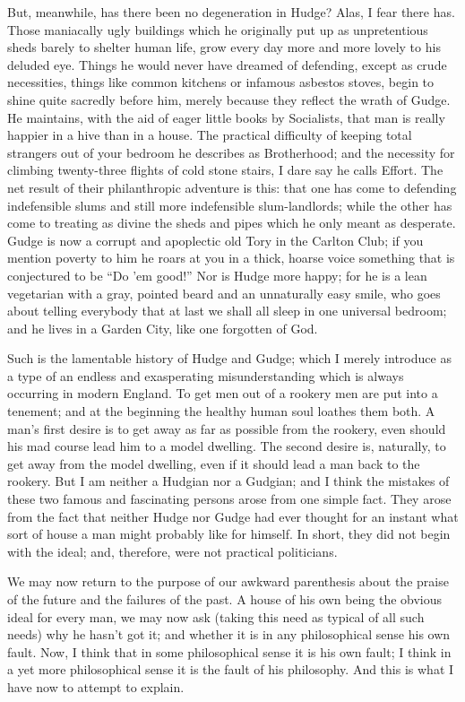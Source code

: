 \documentclass{book}
\begin{document}
But, meanwhile, has there been no degeneration in Hudge? Alas, I fear there has. Those maniacally ugly buildings which he originally put up as unpretentious sheds barely to shelter human life, grow every day more and more lovely to his deluded eye. Things he would never have dreamed of defending, except as crude necessities, things like common kitchens or infamous asbestos stoves, begin to shine quite sacredly before him, merely because they reflect the wrath of Gudge. He maintains, with the aid of eager little books by Socialists, that man is really happier in a hive than in a house. The practical difficulty of keeping total strangers out of your bedroom he describes as Brotherhood; and the necessity for climbing twenty-three flights of cold stone stairs, I dare say he calls Effort. The net result of their philanthropic adventure is this: that one has come to defending indefensible slums and still more indefensible slum-landlords; while the other has come to treating as divine the sheds and pipes which he only meant as desperate. Gudge is now a corrupt and apoplectic old Tory in the Carlton Club; if you mention poverty to him he roars at you in a thick, hoarse voice something that is conjectured to be “Do ’em good!” Nor is Hudge more happy; for he is a lean vegetarian with a gray, pointed beard and an unnaturally easy smile, who goes about telling everybody that at last we shall all sleep in one universal bedroom; and he lives in a Garden City, like one forgotten of God.

Such is the lamentable history of Hudge and Gudge; which I merely introduce as a type of an endless and exasperating misunderstanding which is always occurring in modern England. To get men out of a rookery men are put into a tenement; and at the beginning the healthy human soul loathes them both. A man’s first desire is to get away as far as possible from the rookery, even should his mad course lead him to a model dwelling. The second desire is, naturally, to get away from the model dwelling, even if it should lead a man back to the rookery. But I am neither a Hudgian nor a Gudgian; and I think the mistakes of these two famous and fascinating persons arose from one simple fact. They arose from the fact that neither Hudge nor Gudge had ever thought for an instant what sort of house a man might probably like for himself. In short, they did not begin with the ideal; and, therefore, were not practical politicians.

We may now return to the purpose of our awkward parenthesis about the praise of the future and the failures of the past. A house of his own being the obvious ideal for every man, we may now ask (taking this need as typical of all such needs) why he hasn’t got it; and whether it is in any philosophical sense his own fault. Now, I think that in some philosophical sense it is his own fault; I think in a yet more philosophical sense it is the fault of his philosophy. And this is what I have now to attempt to explain.
\end{document}

